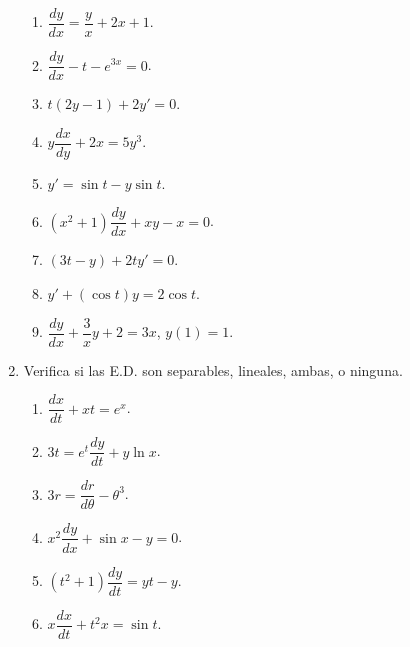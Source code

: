 \documentclass[letterpaper,10pt]{memoir}
\begin{document}
\begin{enumerate}
		\begin{minipage}{0.5\linewidth}
			\begin{enumerate}
				\item \(\dfrac{dy}{dx} = \dfrac{y}{x} +2x+1\).
				\item \(\dfrac{dy}{dx} -t-e^{3x} =0\).
				\item \(t(2y-1) +2y' =0\).
				\item \(y \dfrac{dx}{dy} +2x=5y^3\).
			\end{enumerate}
		\end{minipage} 
		\begin{minipage}{0.5\linewidth}
			\begin{enumerate}
				\setcounter{enumii}{4}
				\item \(y' = \sin t-y \sin t\).
				\item \((x^2+1) \dfrac{dy}{dx} +xy-x=0\).
				\item \((3t-y) +2ty' =0\).
				\item \(y' +(\cos t) y=2 \cos t\).
				\item \(\dfrac{dy}{dx} + \dfrac{3}{x} y +2 = 3x\), \(y(1) =1\).
			\end{enumerate}
		\end{minipage} 
	\item Verifica si las E.D. son separables, lineales, ambas, o ninguna. \\[2mm]
		\begin{minipage}{0.5\linewidth}
			\begin{enumerate}
				\item \(\dfrac{dx}{dt} +xt=e^x\).
				\item \(3t=e^t \dfrac{dy}{dt} +y \ln x\).
				\item \(3r= \dfrac{dr}{d \theta} - \theta ^3\).
			\end{enumerate}
		\end{minipage}\hspace{5mm}
		\begin{minipage}{0.5\linewidth}
			\begin{enumerate}
				\setcounter{enumii}{3}
			\item \(x^2 \dfrac{dy}{dx} + \sin x-y=0\).
			\item \((t^2+1) \dfrac{dy}{dt} =yt-y\).
			\item \(x \dfrac{dx}{dt} +t^2x= \sin t\).
			\end{enumerate}
		\end{minipage}
\end{enumerate}
\end{document}
